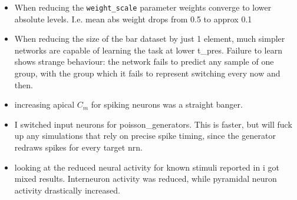 \begin{itemize}
    \item When reducing the \texttt{weight\_scale} parameter weights converge to lower absolute levels. I.e. mean abs
          weight drops from 0.5 to approx 0.1
    \item When reducing the size of the bar dataset by just 1 element, much simpler networks are capable of learning the
          task at lower t\_pres. Failure to learn shows strange behaviour: the network fails to predict any sample of
          one group, with the group which it fails to represent switching every now and then.
    \item increasing apical $C_m$ for spiking neurons was a straight banger.
    \item I switched input neurons for poisson\_generators. This is faster, but will fuck up any simulations that rely
          on precise spike timing, since the generator redraws spikes for every target nrn.
    \item looking at the reduced neural activity for known stimuli reported in \cite{Whittington2017} i got mixed
          results. Interneuron activity was reduced, while pyramidal neuron activity drastically increased.
\end{itemize}